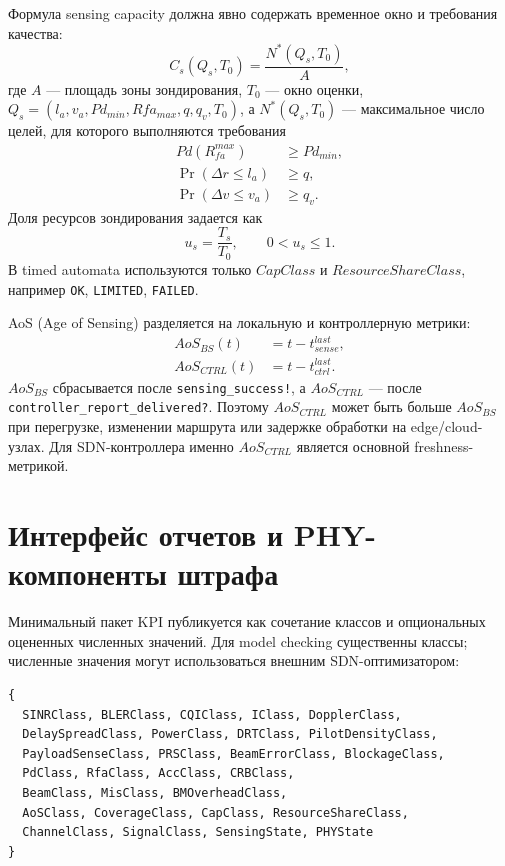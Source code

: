 \documentclass[10pt,a4paper]{article}
\newcommand{\code}[1]{\texttt{#1}}
\begin{document}
Формула sensing capacity должна явно содержать временное окно и требования качества:
\begin{equation}
C_s(Q_s,T_0)=\frac{N^*(Q_s,T_0)}{A},
\end{equation}
где \(A\) --- площадь зоны зондирования, \(T_0\) --- окно оценки, \(Q_s=(l_a,v_a,Pd_{min},Rfa_{max},q,q_v,T_0)\), а \(N^*(Q_s,T_0)\) --- максимальное число целей, для которого выполняются требования
\begin{align}
Pd(R_{fa}^{max})&\ge Pd_{min},\\
\Pr(\Delta r\le l_a)&\ge q,\\
\Pr(\Delta v\le v_a)&\ge q_v.
\end{align}
Доля ресурсов зондирования задается как
\begin{equation}
u_s=\frac{T_s}{T_0},\qquad 0<u_s\le 1.
\end{equation}
В timed automata используются только \(CapClass\) и \(ResourceShareClass\), например \code{OK}, \code{LIMITED}, \code{FAILED}.

AoS (Age of Sensing) разделяется на локальную и контроллерную метрики:
\begin{align}
AoS_{BS}(t)&=t-t_{sense}^{last},\\
AoS_{CTRL}(t)&=t-t_{ctrl}^{last}.
\end{align}
\(AoS_{BS}\) сбрасывается после \code{sensing\_success!}, а \(AoS_{CTRL}\) --- после \code{controller\_report\_delivered?}. Поэтому \(AoS_{CTRL}\) может быть больше \(AoS_{BS}\) при перегрузке, изменении маршрута или задержке обработки на edge/cloud-узлах. Для SDN-контроллера именно \(AoS_{CTRL}\) является основной freshness-метрикой.

\section{Интерфейс отчетов и PHY-компоненты штрафа}

Минимальный пакет KPI публикуется как сочетание классов и опциональных оцененных численных значений. Для model checking существенны классы; численные значения могут использоваться внешним SDN-оптимизатором:
\begin{verbatim}
{
  SINRClass, BLERClass, CQIClass, IClass, DopplerClass,
  DelaySpreadClass, PowerClass, DRTClass, PilotDensityClass,
  PayloadSenseClass, PRSClass, BeamErrorClass, BlockageClass,
  PdClass, RfaClass, AccClass, CRBClass,
  BeamClass, MisClass, BMOverheadClass,
  AoSClass, CoverageClass, CapClass, ResourceShareClass,
  ChannelClass, SignalClass, SensingState, PHYState
}
\end{verbatim}
\end{document}
